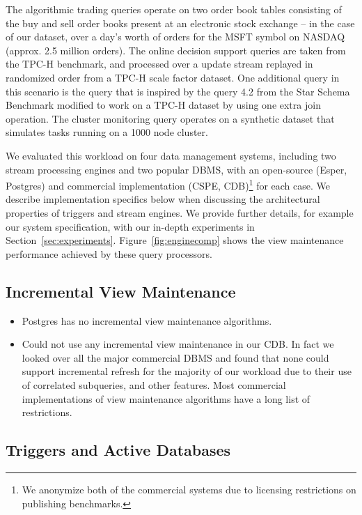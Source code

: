 The algorithmic trading queries operate on two order book tables consisting of
the buy and sell order books present at an electronic stock exchange -- in the
case of our dataset, over a day's worth of orders for the MSFT symbol on NASDAQ
(approx. 2.5 million orders). The online decision support queries are taken from
the TPC-H benchmark, and processed over a update stream replayed in randomized
order from a TPC-H scale factor  dataset. One additional query in this
scenario is the  query that is inspired by the query 4.2 from the
Star Schema Benchmark modified to work on a TPC-H dataset by using one extra
join operation. The cluster monitoring query operates on a synthetic dataset
that simulates tasks running on a 1000 node cluster.


We evaluated this workload on four data management systems, including two stream
processing engines and two popular DBMS, with an open-source (Esper, Postgres)
and commercial implementation (CSPE, CDB)\footnote{We anonymize both of the
commercial systems due to licensing restrictions on publishing benchmarks.} for
each case. We describe implementation specifics below when discussing the
architectural properties of triggers and stream engines. We provide further
details, for example our system specification, with our in-depth experiments in
Section~\ref{sec:experiments}. Figure~\ref{fig:enginecomp} shows the view
maintenance performance achieved by these query processors.

\subsection{Incremental View Maintenance}
\begin{itemize}
  \item Postgres has no incremental view maintenance algorithms.
  \item Could not use any incremental view maintenance in our CDB. In fact we
  looked over all the major commercial DBMS and found that none could support
  incremental refresh for the majority of our workload due to their use of
  correlated subqueries, and other features. Most commercial implementations of
  view maintenance algorithms have a long list of restrictions.
\end{itemize}

\subsection{Triggers and Active Databases}

